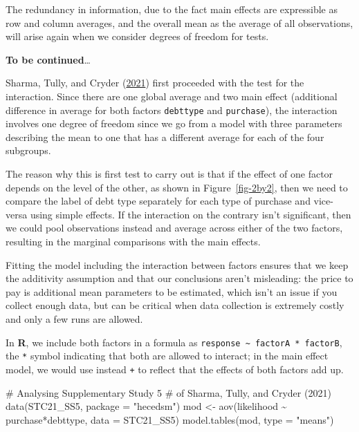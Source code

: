 \documentclass[
  11pt,
  letterpaper,
]{scrbook}
\newenvironment{Shaded}{\begin{snugshade}}{\end{snugshade}}
\newcommand{\AttributeTok}[1]{\textcolor[rgb]{0.40,0.45,0.13}{#1}}
\newcommand{\CommentTok}[1]{\textcolor[rgb]{0.37,0.37,0.37}{#1}}
\newcommand{\FunctionTok}[1]{\textcolor[rgb]{0.28,0.35,0.67}{#1}}
\newcommand{\NormalTok}[1]{\textcolor[rgb]{0.00,0.23,0.31}{#1}}
\newcommand{\OtherTok}[1]{\textcolor[rgb]{0.00,0.23,0.31}{#1}}
\newcommand{\SpecialCharTok}[1]{\textcolor[rgb]{0.37,0.37,0.37}{#1}}
\newcommand{\StringTok}[1]{\textcolor[rgb]{0.13,0.47,0.30}{#1}}
\theoremstyle{definition}
\theoremstyle{remark}
\begin{document}
The redundancy in information, due to the fact main effects are
expressible as row and column averages, and the overall mean as the
average of all observations, will arise again when we consider degrees
of freedom for tests.

\textbf{To be continued}\ldots{}

Sharma, Tully, and Cryder
(\protect\hyperlink{ref-Sharma.Tully.Cryder:2021}{2021}) first proceeded
with the test for the interaction. Since there are one global average
and two main effect (additional difference in average for both factors
\texttt{debttype} and \texttt{purchase}), the interaction involves one
degree of freedom since we go from a model with three parameters
describing the mean to one that has a different average for each of the
four subgroups.

The reason why this is first test to carry out is that if the effect of
one factor depends on the level of the other, as shown in
Figure~\ref{fig-2by2}, then we need to compare the label of debt type
separately for each type of purchase and vice-versa using simple
effects. If the interaction on the contrary isn't significant, then we
could pool observations instead and average across either of the two
factors, resulting in the marginal comparisons with the main effects.

Fitting the model including the interaction between factors ensures that
we keep the additivity assumption and that our conclusions aren't
misleading: the price to pay is additional mean parameters to be
estimated, which isn't an issue if you collect enough data, but can be
critical when data collection is extremely costly and only a few runs
are allowed.

In \textbf{R}, we include both factors in a formula as
\texttt{response\ \textasciitilde{}\ factorA\ *\ factorB}, the
\texttt{*} symbol indicating that both are allowed to interact; in the
main effect model, we would use instead \texttt{+} to reflect that the
effects of both factors add up.

\begin{Shaded}
\begin{Highlighting}[]
\CommentTok{\# Analysing Supplementary Study 5}
\CommentTok{\# of Sharma, Tully, and Cryder (2021)}
\FunctionTok{data}\NormalTok{(STC21\_SS5, }\AttributeTok{package =} \StringTok{"hecedsm"}\NormalTok{)}
\NormalTok{mod }\OtherTok{\textless{}{-}} \FunctionTok{aov}\NormalTok{(likelihood }\SpecialCharTok{\textasciitilde{}}\NormalTok{ purchase}\SpecialCharTok{*}\NormalTok{debttype, }
           \AttributeTok{data =}\NormalTok{ STC21\_SS5)}
\FunctionTok{model.tables}\NormalTok{(mod, }\AttributeTok{type =} \StringTok{"means"}\NormalTok{)}
\end{Highlighting}
\end{Shaded}
\end{document}
